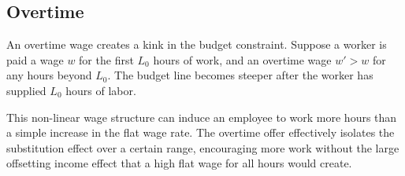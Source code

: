 \subsection{Overtime}
An overtime wage creates a kink in the budget constraint. Suppose a worker is paid a wage $w$ for the first $L_0$ hours of work, and an overtime wage $w' > w$ for any hours beyond $L_0$. The budget line becomes steeper after the worker has supplied $L_0$ hours of labor.

This non-linear wage structure can induce an employee to work more hours than a simple increase in the flat wage rate. The overtime offer effectively isolates the substitution effect over a certain range, encouraging more work without the large offsetting income effect that a high flat wage for all hours would create.
